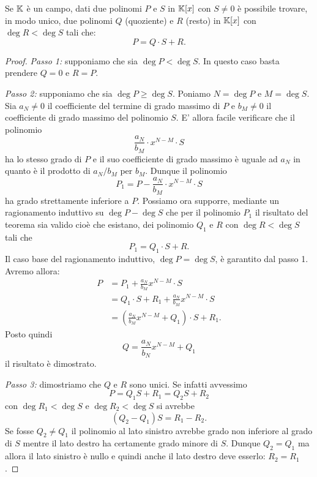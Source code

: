 \begin{theorem}
  \label{th:divisione_polinomi}%
  Se ${\mathbb K}$ è un campo,
  dati due polinomi $P$ e $S$ in ${\mathbb K}[x]$ con $S\neq 0$ è possibile
  trovare, in modo unico, due polinomi $Q$ (quoziente)
  e $R$ (resto) in ${\mathbb K}[x]$ con $\deg R < \deg S$
  tali che:
  \[
    P = Q \cdot S + R.
  \]
  \end{theorem}
  \begin{proof}
  \emph{Passo 1:} supponiamo che sia $\deg P < \deg S$.
  In questo caso basta prendere $Q=0$ e $R=P$.
  
  \emph{Passo 2:} supponiamo che sia $\deg P \ge \deg S$.
  Poniamo $N=\deg P$ e $M=\deg S$.
  Sia $a_N\neq 0$ il coefficiente del termine di grado massimo
  di $P$ e $b_M\neq 0$ il coefficiente di grado massimo
  del polinomio $S$.
  E' allora facile verificare che il polinomio
  \[
  \frac{a_N}{b_M} \cdot x^{N-M}\cdot S
  \]
  ha lo stesso grado di $P$ e il suo coefficiente di grado
  massimo è uguale ad $a_N$ in quanto è il prodotto di
  $a_N/b_M$ per $b_M$.
  Dunque il polinomio
  \[
   P_1 = P - \frac{a_N}{b_M} \cdot x^{N-M}\cdot S
  \]
  ha grado strettamente inferiore a $P$.
  Possiamo ora supporre, mediante un ragionamento induttivo
  su $\deg P - \deg S$
  che per il polinomio $P_1$ il risultato del teorema sia
  valido cioè
  che esistano, dei polinomio $Q_1$ e $R$
  con $\deg R < \deg S$ tali che
  \[
    P_1 = Q_1 \cdot S + R.
  \]
  Il caso base del ragionamento induttivo,
  $\deg P = \deg S$, è garantito dal passo 1.
  Avremo allora:
  \begin{align*}
    P &= P_1 + \frac{a_N}{b_M} x^{N-M}\cdot S\\
      &= Q_1 \cdot S + R_1 + \frac{a_N}{b_M} x^{N-M}\cdot S\\
      &= (\frac{a_N}{b_M} x^{N-M} + Q_1) \cdot S + R_1.
  \end{align*}
  Posto quindi
  \[
   Q = \frac{a_N}{b_N} x^{N-M} + Q_1
  \]
  il risultato è dimostrato.
  
  \emph{Passo 3:} dimostriamo che $Q$ e $R$ sono unici. Se infatti avvessimo 
  \[
    P = Q_1 S + R_1 = Q_2 S + R_2   
  \]
  con $\deg R_1<\deg S$ e $\deg R_2 < \deg S$ si avrebbe 
  \[
  (Q_2 - Q_1) S = R_1 - R_2.    
  \]
  Se fosse $Q_2 \neq Q_1$ il polinomio al lato sinistro avrebbe grado non inferiore al grado di 
  $S$ mentre il lato destro ha certamente grado minore di $S$.
  Dunque $Q_2=Q_1$ ma allora il lato sinistro è nullo e quindi anche il lato destro deve 
  esserlo: $R_2=R_1$.
  \end{proof}
  
